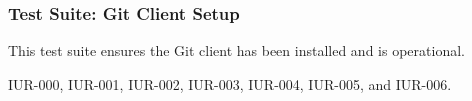 \subsubsection{Test Suite: Git Client Setup}
\begin{description}[align=right,leftmargin=3.2cm,labelindent=3.0cm]
\item[Purpose:] This test suite ensures the Git client has been installed and is operational.
\item[Requirement:] IUR-000, IUR-001, IUR-002, IUR-003, IUR-004, IUR-005, and IUR-006.
\end{description}
